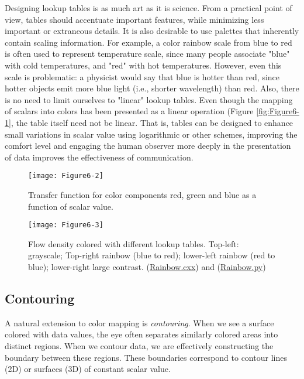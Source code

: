 Designing lookup tables is as much art as it is science. From a practical point of view, tables should accentuate important features, while minimizing less important or extraneous details. It is also desirable to use palettes that inherently contain scaling information. For example, a color rainbow scale from blue to red is often used to represent temperature scale, since many people associate "blue" with cold temperatures, and "red" with hot temperatures. However, even this scale is problematic: a physicist would say that blue is hotter than red, since hotter objects emit more blue light (i.e., shorter wavelength) than red. Also, there is no need to limit ourselves to "linear" lookup tables. Even though the mapping of scalars into colors has been presented as a linear operation (Figure \ref{fig:Figure6-1}, the table itself need not be linear. That is, tables can be designed to enhance small variations in scalar value using logarithmic or other schemes, improving the comfort level and engaging the human observer more deeply in the presentation of data improves the effectiveness of communication.

\begin{figure}[!htb]
	\centering
	\texttt{[image: Figure6-2]}
	\caption{Transfer function for color components red, green and blue as a function of scalar value.}
	\label{fig:Figure6-2}
\end{figure}

\begin{figure}[!htb]
	\centering
	\texttt{[image: Figure6-3]}
	\caption{Flow density colored with different lookup tables. Top-left: grayscale; Top-right rainbow (blue to red); lower-left rainbow (red to blue); lower-right large contrast. (\href{https://lorensen.github.io/VTKExamples/site/Cxx/Rendering/Rainbow/}{Rainbow.cxx}) and (\href{https://lorensen.github.io/VTKExamples/site/Python/Rendering/Rainbow/}{Rainbow.py})}
	\label{fig:Figure6-3}
\end{figure}

\subsection{Contouring}

A natural extension to color mapping is \emph{contouring}. When we see a surface colored with data values, the eye often separates similarly colored areas into distinct regions. When we contour data, we are effectively constructing the boundary between these regions. These boundaries correspond to contour lines (2D) or surfaces (3D) of constant scalar value.

